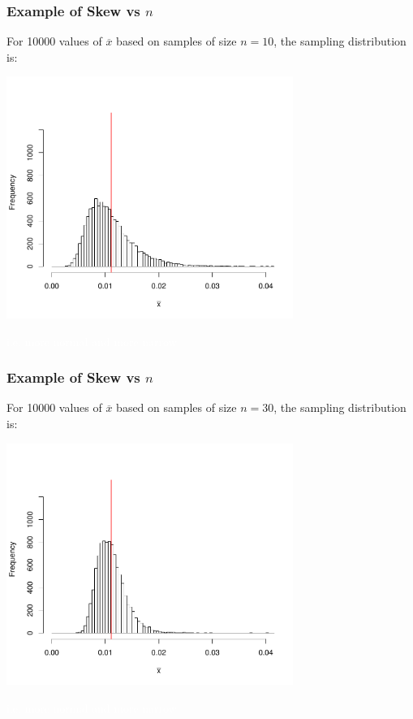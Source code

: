 \documentclass[slides]{beamer}
\newcommand{\blue}[1]{\textcolor{blue2}{#1}}
\newcommand{\white}[1]{\textcolor{white}{#1}}
\newcommand{\xbar}{\overline{x}}
\begin{document}
\begin{frame}
\frametitle{Example of Skew vs $n$}
For 10000 values of $\xbar$ based on samples of size \blue{$n=10$}, the sampling distribution is:
\begin{center}
\includegraphics[width=0.7\textwidth]{figure/hist10.pdf}
\end{center}
\white{i.e. more normal and more narrow}
\end{frame}


\begin{frame}
\frametitle{Example of Skew vs $n$}
For 10000 values of $\xbar$ based on samples of size \blue{$n=30$}, the sampling distribution is:
\begin{center}
\includegraphics[width=0.7\textwidth]{figure/hist30.pdf}
\end{center}
\white{i.e. more normal and more narrow}
\end{frame}
\end{document}

